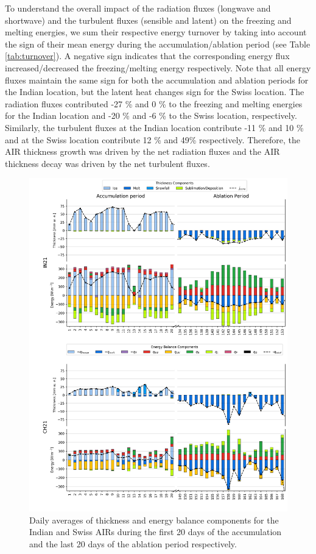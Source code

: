 \documentclass[utf8]{frontiersSCNS}
\begin{document}
To understand the overall impact of the radiation fluxes (longwave and shortwave) and the turbulent fluxes
(sensible and latent) on the freezing and melting energies, we sum their respective energy turnover by taking into
account the sign of their mean energy during the accumulation/ablation period (see Table \ref{tab:turnover}). A
negative sign indicates that the corresponding energy flux increased/decreased the freezing/melting energy
respectively. Note that all energy fluxes maintain the same sign for both the accumulation and ablation
periods for the Indian location, but the latent heat changes sign for the Swiss location. The radiation fluxes
contributed -27 \% and 0 \% to the freezing and melting energies for the Indian location and -20 \% and -6 \%
to the Swiss location, respectively.  Similarly, the turbulent fluxes at the Indian location contribute -11 \% and
10 \% and at the Swiss location contribute 12 \% and 49\%  respectively. Therefore, the AIR thickness growth was
driven by the net radiation fluxes and the AIR thickness decay was driven by the net turbulent fluxes.

\begin{figure}
	\begin{center}
		\includegraphics[width=\linewidth]{Figures/Figure_7.jpg} \end{center}
	\caption{Daily averages of thickness and energy balance components for the Indian and Swiss AIRs during the
		first 20 days of the accumulation and the last 20 days of the ablation period respectively.  } \label{fig:MEB}
\end{figure}
\end{document}
